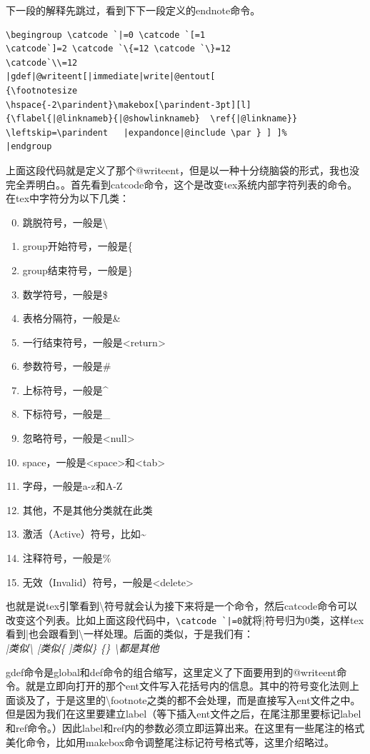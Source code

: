 \documentclass[11pt,oneside]{book}
\begin{document}
下一段的解释先跳过，看到下下一段定义的endnote命令。
\begin{Verbatim}
\begingroup \catcode `|=0 \catcode `[=1
\catcode`]=2 \catcode `\{=12 \catcode `\}=12
\catcode`\\=12
|gdef|@writeent[|immediate|write|@entout[
{\footnotesize
\hspace{-2\parindent}\makebox[\parindent-3pt][l]
{\flabel{|@linknameb}{|@showlinknameb}  \ref{|@linkname}}
\leftskip=\parindent   |expandonce|@include \par } ] ]%
|endgroup
\end{Verbatim}
上面这段代码就是定义了那个@writeent，但是以一种十分绕脑袋的形式，我也没完全弄明白。。首先看到catcode命令，这个是改变tex系统内部字符列表的命令。在tex中字符分为以下几类：
\begin{enumerate}
\setcounter{enumi}{-1}
\item 跳脱符号，一般是\textbackslash
\item group开始符号，一般是\{
\item group结束符号，一般是\}
\item 数学符号，一般是\$
\item 表格分隔符，一般是\&
\item 一行结束符号，一般是<return>
\item 参数符号，一般是\#
\item 上标符号，一般是\^{}
\item 下标符号，一般是\_
\item 忽略符号，一般是<null>
\item space，一般是<space>和<tab>
\item 字母，一般是a-z和A-Z
\item 其他，不是其他分类就在此类
\item 激活（Active）符号，比如\~{}
\item 注释符号，一般是\%
\item 无效（Invalid）符号，一般是<delete>
\end{enumerate}
也就是说tex引擎看到\textbackslash 符号就会认为接下来将是一个命令，然后catcode命令可以改变这个列表。比如上面这段代码中，\verb+\catcode `|=0+就将|符号归为0类，这样tex看到|也会跟看到\textbackslash 一样处理。后面的类似，于是我们有：\\
\emph{|类似\textbackslash{  }   [类似\{  ]类似\}  \{\} \textbackslash 都是其他 }

gdef命令是global和def命令的组合缩写，这里定义了下面要用到的@writeent命令。就是立即向打开的那个ent文件写入花括号内的信息。其中的符号变化法则上面谈及了，于是这里的\textbackslash footnote之类的都不会处理，而是直接写入ent文件之中。但是因为我们在这里要建立label（等下插入ent文件之后，在尾注那里要标记label和ref命令。）因此label和ref内的参数必须立即运算出来。在这里有一些尾注的格式美化命令，比如用makebox命令调整尾注标记符号格式等，这里介绍略过。
\end{document}
